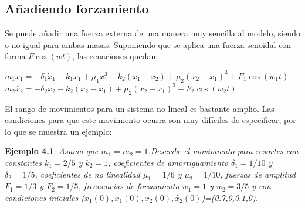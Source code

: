 \documentclass{article}
\begin{document}
\subsection{Añadiendo forzamiento}
Se puede añadir una fuerza externa de una manera muy sencilla al modelo, siendo o no igual para ambas masas. Suponiendo que se aplica una fuerza senoidal con forma $F\cos(wt)$, las ecuaciones quedan:
\begin{center}
$m_{1}\ddot{x_{1}}=-\delta_{1} \dot{x}_{1}-k_{1}x_{1}+\mu_{1} x^{3}_{1}-k_{2}(x_{1}-x_{2})+\mu_{2} (x_{2}-x_{1})^{3}+F_{1}\cos(w_{1}t)$ \\
$m_{2}\ddot{x_{2}}=-\delta_{2} \dot{x}_{2}-k_{2}(x_{2}-x_{1})+\mu_{2} (x_{2}-x_{1})^{3}+F_{2}\cos(w_{2}t)$
\end{center}
El rango de movimientos para un sistema no lineal es bastante amplio. Las condiciones para que este movimiento ocurra son muy difíciles de especificar, por lo que se muestra un ejemplo:

\textbf{Ejemplo 4.1}:\textsl{ Asuma que $m_{1}=m_{2}=1$.Describe el movimiento para resortes con constantes $k_{1}=2/5$ y $k_{2}=1$, coeficientes de amortiguamiento $\delta_{1}=1/10$ y $\delta_{2}=1/5$, coeficientes de no linealidad $\mu_{1}=1/6$ y $\mu_{2}=1/10$, fuerzas de amplitud $F_{1}=1/3$ y $F_{2}=1/5$, frecuencias de forzamiento $w_{1}=1$ y $w_{2}=3/5$ y con condiciones iniciales ($x_{1}(0),\dot{x_{1}}(0), x_{2}(0),\dot{x_{2}}(0)$)=(0.7,0,0.1,0).}
\end{document}
